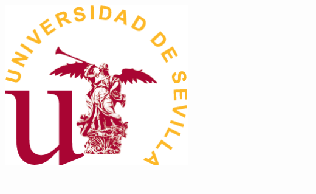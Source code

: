\begin{titlepage}

\newcommand{\HRule}{\rule{\linewidth}{0.5mm}} %

\center %


\begin{minipage}{14cm}
\center

\includegraphics[width=8cm,height=8cm]{logo}\\[1.5cm] %






\HRule \\[0.5cm]


\end{minipage}
\end{titlepage}
